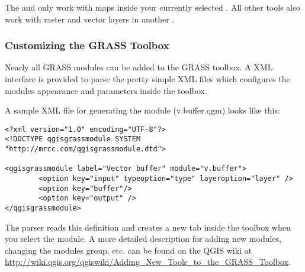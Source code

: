 The  and 
 only work with maps inside 
your currently selected . All other tools also work with 
raster and vector layers in another .

\subsubsection{Customizing the GRASS Toolbox} 
\label{sec:toolbox-customizing}

Nearly all GRASS modules can be added to the GRASS toolbox. A XML 
interface is provided to parse the pretty simple XML files which configures 
the modules appearance and parameters inside the toolbox.

A sample XML file for generating the module  (v.buffer.qgm) 
looks like this:
\begin{verbatim}
<?xml version="1.0" encoding="UTF-8"?>
<!DOCTYPE qgisgrassmodule SYSTEM "http://mrcc.com/qgisgrassmodule.dtd">

<qgisgrassmodule label="Vector buffer" module="v.buffer">
        <option key="input" typeoption="type" layeroption="layer" />
        <option key="buffer"/>
        <option key="output" />
</qgisgrassmodule>
\end{verbatim}

The parser reads this definition and creates a new tab inside the toolbox 
when you select the module. A more detailed description for adding new 
modules, changing the modules group, etc. can be found on the QGIS wiki at \\
\url{http://wiki.qgis.org/qgiswiki/Adding\_New\_Tools\_to\_the\_GRASS\_Toolbox}.

